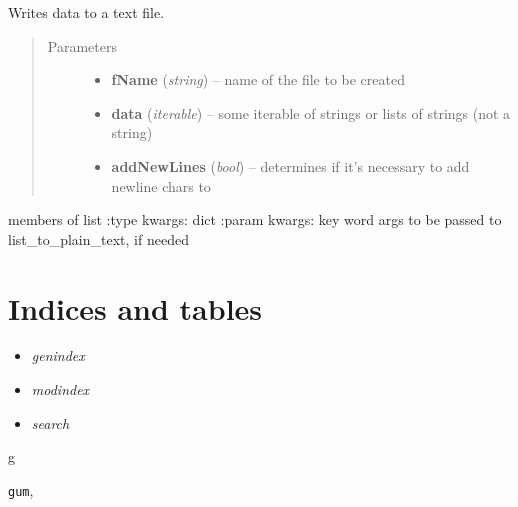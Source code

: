 \documentclass[letterpaper,10pt,english]{sphinxmanual}
\begin{document}

\begin{fulllineitems}
\label{test:gum.write_to_txt}
Writes data to a text file.
\begin{quote}\begin{description}
\item[{Parameters}] \leavevmode\begin{itemize}
\item {} 
\textbf{fName} (\emph{string}) -- name of the file to be created

\item {} 
\textbf{data} (\emph{iterable}) -- some iterable of strings or lists of strings (not a string)

\item {} 
\textbf{addNewLines} (\emph{bool}) -- determines if it's necessary to add newline chars to

\end{itemize}

\end{description}\end{quote}

members of list
:type kwargs: dict
:param kwargs: key word args to be passed to list\_to\_plain\_text, if needed

\end{fulllineitems}



\chapter{Indices and tables}
\label{index:indices-and-tables}\begin{itemize}
\item {} 
\emph{genindex}

\item {} 
\emph{modindex}

\item {} 
\emph{search}

\end{itemize}


\renewcommand{\indexname}{Python Module Index}
\begin{theindex}
\def\bigletter#1{{\Large\sffamily#1}\nopagebreak\vspace{1mm}}
\bigletter{g}
\item {\texttt{gum}}, \pageref{test:module-gum}
\end{theindex}

\renewcommand{\indexname}{Index}
\printindex
\end{document}
